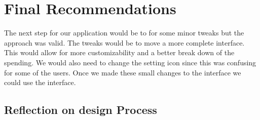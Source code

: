 \documentclass{chi2011}
\begin{document}
\section{Final Recommendations}
	
The next step for our application would be to for some minor tweaks but the
approach was valid. The tweaks would be to move a more complete interface. This
would allow for more customizability and a better break down of the spending. We
would also need to change the setting icon since this was confusing for some of
the users. Once we made these small changes to the interface we could use the
interface. 

\subsection{Reflection on design Process}
\end{document}

